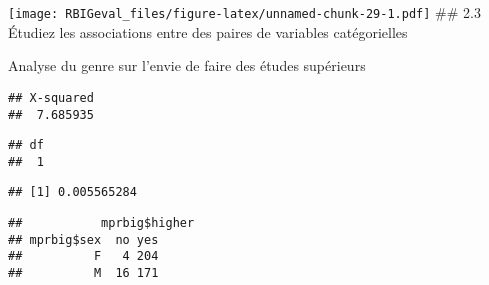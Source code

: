 \documentclass[
]{article}
\newenvironment{Shaded}{\begin{snugshade}}{\end{snugshade}}
\newcommand{\CommentTok}[1]{\textcolor[rgb]{0.56,0.35,0.01}{\textit{#1}}}
\newcommand{\KeywordTok}[1]{\textcolor[rgb]{0.13,0.29,0.53}{\textbf{#1}}}
\newcommand{\NormalTok}[1]{#1}
\newcommand{\OperatorTok}[1]{\textcolor[rgb]{0.81,0.36,0.00}{\textbf{#1}}}
\newcommand{\StringTok}[1]{\textcolor[rgb]{0.31,0.60,0.02}{#1}}
\begin{document}
\texttt{[image: RBIGeval\_files/figure-latex/unnamed-chunk-29-1.pdf]}
\#\# 2.3 Étudiez les associations entre des paires de variables
catégorielles

Analyse du genre sur l'envie de faire des études supérieurs

\begin{Shaded}
\end{Shaded}

\begin{verbatim}
## X-squared 
##  7.685935
\end{verbatim}

\begin{Shaded}
\end{Shaded}

\begin{verbatim}
## df 
##  1
\end{verbatim}

\begin{Shaded}
\end{Shaded}

\begin{verbatim}
## [1] 0.005565284
\end{verbatim}

\begin{Shaded}
\end{Shaded}

\begin{verbatim}
##           mprbig$higher
## mprbig$sex  no yes
##          F   4 204
##          M  16 171
\end{verbatim}
\end{document}
